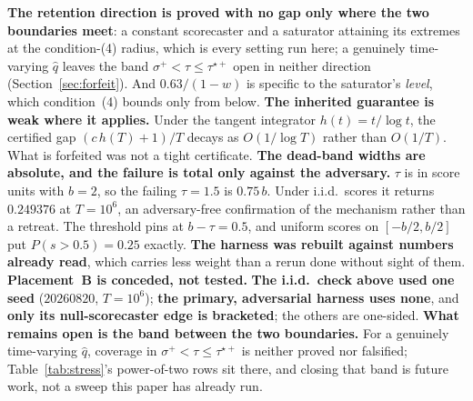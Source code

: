 \textbf{The retention direction is proved with no gap only where the two boundaries meet}: a
constant scorecaster and a saturator attaining its extremes at the condition-(4) radius, which
is every setting run here; a genuinely time-varying $\hat{q}$ leaves the band $\sigma^{+} <
\tau \le \tau^{\star+}$ open in neither direction (Section~\ref{sec:forfeit}). And $0.63/(1-w)$
is specific to the saturator's \emph{level}, which condition~(4) bounds only from below.
\textbf{The inherited guarantee is weak where it applies.} Under the tangent integrator
$h(t) = t/\log t$, the certified gap $(c\,h(T)+1)/T$ decays as $O(1/\log T)$ rather than $O(1/T)$.
What is forfeited was not a tight certificate. \textbf{The dead-band widths are absolute, and the
failure is total only against the adversary.} $\tau$ is in score units with $b = 2$, so the
failing $\tau = 1.5$ is $0.75\,b$. Under i.i.d.\ scores it returns $0.249376$ at $T = 10^6$, an
adversary-free confirmation of the mechanism rather than a retreat. The threshold pins at
$b-\tau = 0.5$, and uniform scores on $[-b/2,b/2]$ put $P(s > 0.5) = 0.25$ exactly.
\textbf{The harness was rebuilt against numbers already read}, which carries less weight than a
rerun done without sight of them. \textbf{Placement~B is conceded, not tested.} \textbf{The i.i.d.\
check above used one seed} ($20260820$, $T = 10^6$); \textbf{the primary, adversarial harness uses
none}, and \textbf{only its null-scorecaster edge is bracketed}; the others are one-sided.
\textbf{What remains open is the band between the two boundaries.} For a genuinely
time-varying $\hat{q}$, coverage in $\sigma^{+} < \tau \le \tau^{\star+}$ is neither proved nor
falsified; Table~\ref{tab:stress}'s power-of-two rows sit there, and closing that band is
future work, not a sweep this paper has already run.
